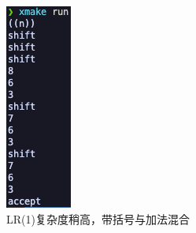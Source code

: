 \begin{figure}[htbp]
\begin{minipage}[t]{0.2\textwidth}
        \caption{LR(1)复杂度稍高，带括号与加法混合}
        \label{fig:lr-4}
    \end{minipage}
    \begin{minipage}[t]{0.2\textwidth}
        \centering
        \includegraphics[width=\textwidth]{images/lr_5.png}

\end{minipage}
\end{figure}
